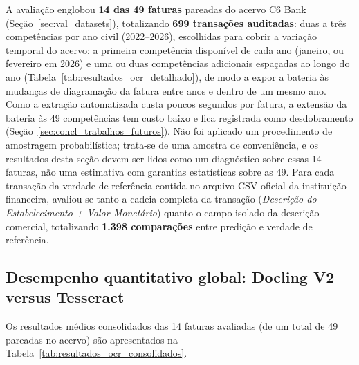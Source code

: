 A avaliação englobou \textbf{14 das 49 faturas} pareadas do acervo C6 Bank (Seção~\ref{sec:val_datasets}), totalizando \textbf{699 transações auditadas}: duas a três competências por ano civil (2022--2026), escolhidas para cobrir a variação temporal do acervo: a primeira competência disponível de cada ano (janeiro, ou fevereiro em 2026) e uma ou duas competências adicionais espaçadas ao longo do ano (Tabela~\ref{tab:resultados_ocr_detalhado}), de modo a expor a bateria às mudanças de diagramação da fatura entre anos e dentro de um mesmo ano. Como a extração automatizada custa poucos segundos por fatura, a extensão da bateria às 49 competências tem custo baixo e fica registrada como desdobramento (Seção~\ref{sec:concl_trabalhos_futuros}). Não foi aplicado um procedimento de amostragem probabilística; trata-se de uma amostra de conveniência, e os resultados desta seção devem ser lidos como um diagnóstico sobre essas 14 faturas, não uma estimativa com garantias estatísticas sobre as 49. Para cada transação da verdade de referência contida no arquivo CSV oficial da instituição financeira, avaliou-se tanto a cadeia completa da transação (\textit{Descrição do Estabelecimento + Valor Monetário}) quanto o campo isolado da descrição comercial, totalizando \textbf{1.398 comparações} entre predição e verdade de referência.

\subsection{Desempenho quantitativo global: Docling V2 versus Tesseract}

Os resultados médios consolidados das 14 faturas avaliadas (de um total de 49 pareadas no acervo) são apresentados na Tabela~\ref{tab:resultados_ocr_consolidados}.

